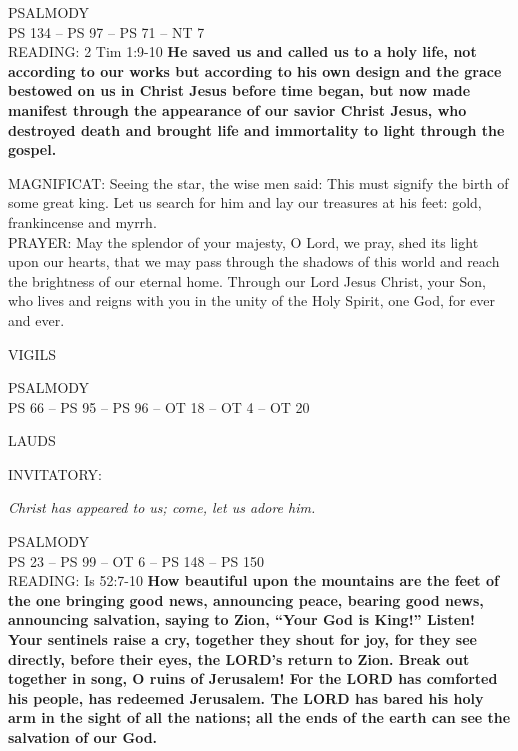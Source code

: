 \noindent\small{\uppercase{PSALMODY}\\}\label{christmas:epiphany:firstVespers:psalmody}
\uppercase{Ps 134 -- Ps 97 -- Ps 71 -- NT 7}\vspace{0.5em}\\

\noindent\small{\uppercase{READING:}}    2 Tim 1:9-10 \textbf{   He saved us and called us to a holy life, not according to our works but according to his own design and the grace bestowed on us in Christ Jesus before time began, but now made manifest through the appearance of our savior Christ Jesus, who destroyed death and brought life and immortality to light through the gospel.\\}

\noindent\small{\uppercase{MAGNIFICAT:}}	Seeing the star, the wise men said: This must signify the birth of some great king. Let us search for him and lay our treasures at his feet: gold, frankincense and myrrh.\\

\noindent\small{\uppercase{PRAYER:}}	May the splendor of your majesty, O Lord, we pray, shed its light upon our hearts, that we may pass through the shadows of this world and reach the brightness of our eternal home. Through our Lord Jesus Christ, your Son, who lives and reigns with you in the unity of the Holy  Spirit, one God, for ever and ever.

\begin{flushleft}\normalsize{\uppercase{VIGILS\\}}\end{flushleft}
\noindent\small{\uppercase{PSALMODY}\\}
\uppercase{Ps 66 -- Ps 95 -- Ps 96 -- OT 18 -- OT 4 -- OT 20}\vspace{0.5em}

\begin{flushleft}\normalsize{\uppercase{LAUDS}}\end{flushleft}
\small{\uppercase{INVITATORY:}}\normalsize
\begin{center}
\textit{Christ has appeared to us; come, let us adore him.\\}
\end{center}
\noindent\small{\uppercase{PSALMODY}\\}
\uppercase{Ps 23 -- Ps 99 -- OT 6 -- Ps 148 -- Ps 150}\\
\noindent\small{\uppercase{READING:}}    Is 52:7-10 \textbf{    How beautiful upon the mountains are the feet of the one bringing good news, announcing peace, bearing good news, announcing salvation, saying to Zion, “Your God is King!” Listen! Your sentinels raise a cry, together they shout for joy, for they see directly, before their eyes, the LORD’s return to Zion. Break out together in song, O ruins of Jerusalem! For the LORD has comforted his people, has redeemed Jerusalem. The LORD has bared his holy arm in the sight of all the nations; all the ends of the earth can see the salvation of our God.\\}

